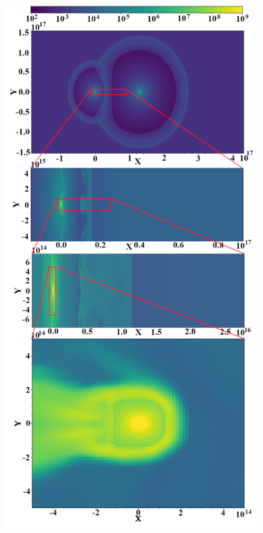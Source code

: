 \documentclass{article}
\begin{document}
	\begin{figure}
		\centering
		\begin{minipage}{0.49\textwidth}
			\centering
			\includegraphics[width=0.99\textwidth]{./fig/density.png} 

\end{minipage}
\end{figure}
\end{document}
